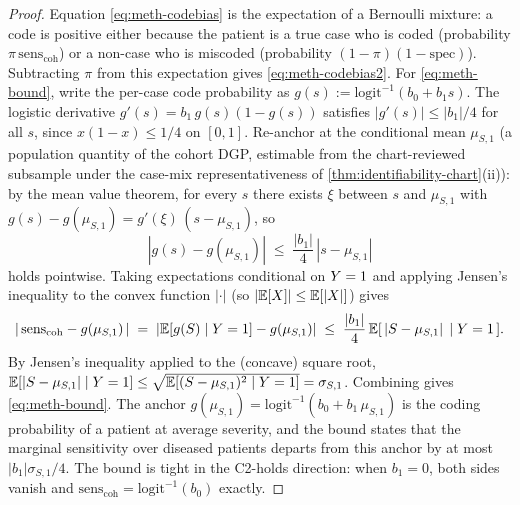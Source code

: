 \begin{proof}
Equation \eqref{eq:meth-codebias} is the expectation of a Bernoulli
mixture: a code is positive either because the patient is a true case
who is coded (probability $\pi\,\mathrm{sens}_{\text{coh}}$) or a
non-case who is miscoded (probability $(1-\pi)(1-\mathrm{spec})$).
Subtracting $\pi$ from this expectation gives
\eqref{eq:meth-codebias2}. For \eqref{eq:meth-bound}, write the
per-case code probability as $g(s) := \mathrm{logit}^{-1}(b_0 + b_1
s)$. The logistic derivative $g'(s) = b_1\,g(s)(1-g(s))$ satisfies
$|g'(s)| \le |b_1|/4$ for all $s$, since $x(1-x) \le 1/4$ on $[0,1]$.
Re-anchor at the conditional mean $\mu_{S,1}$ (a population quantity
of the cohort DGP, estimable from the chart-reviewed subsample under
the case-mix representativeness of \cref{thm:identifiability-chart}(ii)):
by the mean value theorem, for every $s$ there exists $\xi$ between
$s$ and $\mu_{S,1}$ with
$g(s) - g(\mu_{S,1}) = g'(\xi)\,(s - \mu_{S,1})$, so
\begin{equation*}
  |g(s) - g(\mu_{S,1})|
    \;\le\;
    \frac{|b_1|}{4}\,|s - \mu_{S,1}|
\end{equation*}
holds pointwise. Taking expectations conditional on $Y = 1$ and
applying Jensen's inequality to the convex function $|\cdot|$ (so
$|\mathbb{E}[X]| \le \mathbb{E}[|X|]$) gives
\begin{equation*}
  |\,\mathrm{sens}_{\text{coh}} - g(\mu_{S,1})\,|
    \;=\; |\mathbb{E}[g(S) \mid Y = 1] - g(\mu_{S,1})|
    \;\le\; \frac{|b_1|}{4}\,\mathbb{E}[\,|S - \mu_{S,1}| \,\mid Y = 1\,].
\end{equation*}
By Jensen's inequality applied to the (concave) square root, $\mathbb{E}[|S -
\mu_{S,1}| \mid Y = 1] \le \sqrt{\mathbb{E}[(S - \mu_{S,1})^2 \mid Y = 1]} =
\sigma_{S,1}$. Combining gives \eqref{eq:meth-bound}. The anchor
$g(\mu_{S,1}) = \mathrm{logit}^{-1}(b_0 + b_1\,\mu_{S,1})$ is the
coding probability of a patient at average severity, and the bound
states that the marginal sensitivity over diseased patients departs
from this anchor by at most $|b_1|\sigma_{S,1}/4$. The bound is tight
in the C2-holds direction: when $b_1 = 0$, both sides vanish and
$\mathrm{sens}_{\text{coh}} = \mathrm{logit}^{-1}(b_0)$ exactly.
\end{proof}

